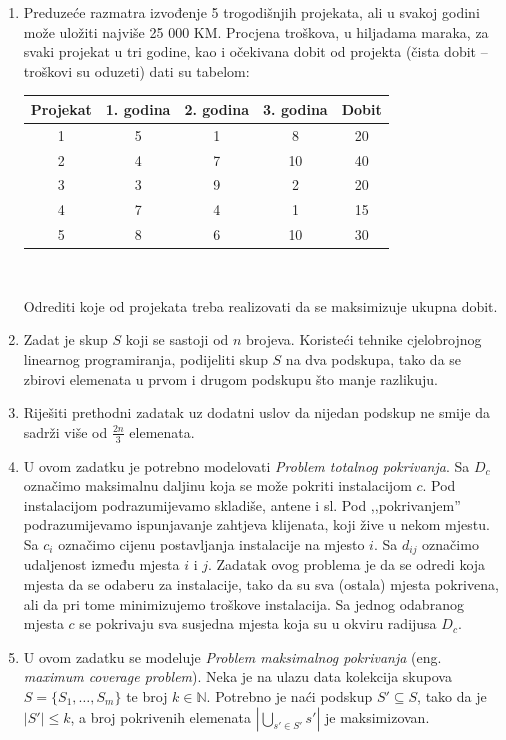 \documentclass[a4paper, utf8, 11pt, colorlinks]{book}
\theoremstyle{definition}
\begin{document}
\begin{enumerate}
	
	\item Preduzeće  razmatra izvođenje 5 trogodišnjih projekata, ali u svakoj godini može uložiti najviše
	25 000 KM. Procjena troškova, u hiljadama maraka, za svaki projekat u tri godine, kao i
	očekivana dobit od projekta (čista dobit – troškovi su oduzeti)  dati su tabelom:
\begin{center}

	\begin{tabular}{|c|c|c|c|c|}
		\hline
		Projekat & 1. godina & 2. godina & 3. godina & Dobit \\
		\hline
		1 & 5 & 1 & 8 & 20 \\
		\hline
		2 & 4 & 7 & 10 & 40 \\
		\hline
		3 & 3 & 9 & 2 & 20 \\
		\hline
		4 & 7 & 4 & 1 & 15 \\
		\hline
		5 & 8 & 6 & 10 & 30 \\
		\hline
	\end{tabular}  \\
\end{center}
	Odrediti koje od projekata treba realizovati da se maksimizuje ukupna dobit.
	
	\item Zadat je skup $S$ koji se sastoji od $n$ brojeva. Koristeći tehnike cjelobrojnog linearnog programiranja, podijeliti skup $S$ na dva podskupa, tako da se zbirovi elemenata u prvom i drugom podskupu što manje razlikuju.
	
	\item Riješiti prethodni zadatak uz dodatni uslov da nijedan podskup ne smije da sadrži više od $\frac {2n}3$ elemenata.
	

	
	\item U ovom zadatku je potrebno modelovati \emph{Problem totalnog pokrivanja}. %
	Sa $D_c$ označimo maksimalnu daljinu koja se može pokriti instalacijom $c$. Pod instalacijom podrazumijevamo skladiše, antene i sl. Pod ,,pokrivanjem'' podrazumijevamo ispunjavanje zahtjeva klijenata, koji žive u nekom mjestu. Sa $c_i$ označimo cijenu postavljanja instalacije na mjesto $i$. Sa $d_{ij}$ označimo udaljenost između mjesta $i$ i $j$. Zadatak ovog problema je da se odredi koja mjesta da se odaberu za instalacije, tako da su sva (ostala) mjesta pokrivena, ali da pri tome minimizujemo troškove instalacija. Sa jednog odabranog mjesta $c$ se pokrivaju sva susjedna mjesta koja su u okviru radijusa $D_c$.  
	\item U ovom zadatku se modeluje  \emph{Problem maksimalnog pokrivanja} (eng. \emph{maximum coverage problem}). Neka je na ulazu data kolekcija skupova  $S=\{ S_1, \ldots, S_m\}$ te broj $k \in \mathbb{N}$. Potrebno je naći podskup $S' \subseteq S$, tako da je $|S'|\leq k$, a broj pokrivenih elemenata $|\bigcup_{s' \in S'} s'|$ je maksimizovan. 
	

\end{enumerate}
\end{document}
